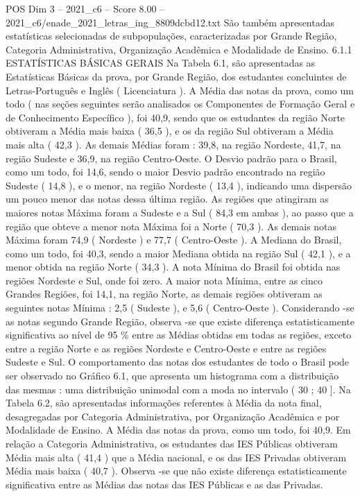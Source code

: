 \begin{textsample}{POS Dim 3 – 2021\_c6 – Score 8.00 – 2021\_c6/enade\_2021\_letras\_ing\_8809dcbd12.txt}
São também apresentadas estatísticas selecionadas de subpopulações, caracterizadas por Grande Região, Categoria Administrativa, Organização Acadêmica e Modalidade de Ensino. 6.1.1 ESTATÍSTICAS BÁSICAS GERAIS Na Tabela 6.1, são apresentadas as Estatísticas Básicas da prova, por Grande Região, dos estudantes concluintes de Letras-Português e Inglês ( Licenciatura ).
A Média das notas da prova, como um todo ( nas seções seguintes serão analisados os Componentes de Formação Geral e de Conhecimento Específico ), foi 40,9, sendo que os estudantes da região Norte obtiveram a Média mais baixa ( 36,5 ), e os da região Sul obtiveram a Média mais alta ( 42,3 ).
As demais Médias foram : 39,8, na região Nordeste, 41,7, na região Sudeste e 36,9, na região Centro-Oeste.
O Desvio padrão para o Brasil, como um todo, foi 14,6, sendo o maior Desvio padrão encontrado na região Sudeste ( 14,8 ), e o menor, na região Nordeste ( 13,4 ), indicando uma dispersão um pouco menor das notas dessa última região.
As regiões que atingiram as maiores notas Máxima foram a Sudeste e a Sul ( 84,3 em ambas ), ao passo que a região que obteve a menor nota Máxima foi a Norte ( 70,3 ).
As demais notas Máxima foram 74,9 ( Nordeste ) e 77,7 ( Centro-Oeste ).
A Mediana do Brasil, como um todo, foi 40,3, sendo a maior Mediana obtida na região Sul ( 42,1 ), e a menor obtida na região Norte ( 34,3 ).
A nota Mínima do Brasil foi obtida nas regiões Nordeste e Sul, onde foi zero.
A maior nota Mínima, entre as cinco Grandes Regiões, foi 14,1, na região Norte, as demais regiões obtiveram as seguintes notas Mínima : 2,5 ( Sudeste ), e 5,6 ( Centro-Oeste ).
Considerando -se as notas segundo Grande Região, observa -se que existe diferença estatisticamente significativa ao nível de 95 \% entre as Médias obtidas em todas as regiões, exceto entre a região Norte e as regiões Nordeste e Centro-Oeste e entre as regiões Sudeste e Sul.
O comportamento das notas dos estudantes de todo o Brasil pode ser observado no Gráfico 6.1, que apresenta um histograma com a distribuição das mesmas : uma distribuição unimodal com a moda no intervalo ( 30 ; 40 ].
Na Tabela 6.2, são apresentadas informações referentes à Média da nota final, desagregadas por Categoria Administrativa, por Organização Acadêmica e por Modalidade de Ensino.
A Média das notas da prova, como um todo, foi 40,9.
Em relação a Categoria Administrativa, os estudantes das IES Públicas obtiveram Média mais alta ( 41,4 ) que a Média nacional, e os das IES Privadas obtiveram Média mais baixa ( 40,7 ).
Observa -se que não existe diferença estatisticamente significativa entre as Médias das notas das IES Públicas e as das Privadas.

\end{textsample}
